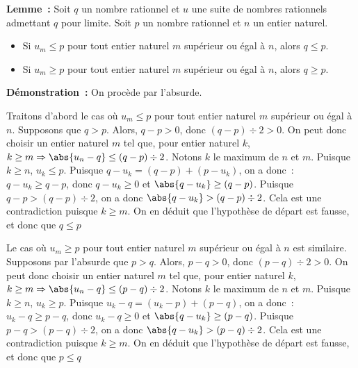 \medskip

\noindent\textbf{Lemme :} Soit $q$ un nombre rationnel et $u$ une suite de nombres rationnels admettant $q$ pour limite.
    Soit $p$ un nombre rationnel et $n$ un entier naturel.
    \begin{itemize}[nosep]
        \item Si $u_m \leq p$ pour tout entier naturel $m$ supérieur ou égal à $n$, alors $q \leq p$.
        \item Si $u_m \geq p$ pour tout entier naturel $m$ supérieur ou égal à $n$, alors $q \geq p$.
    \end{itemize}

\medskip

\noindent\textbf{Démonstration :} On procède par l'absurde.
    
    Traitons d'abord le cas où $u_m \leq p$ pour tout entier naturel $m$ supérieur ou égal à $n$.
    Supposons que $q > p$. 
    Alors, $q - p > 0$, donc $(q - p) \div 2 > 0$. 
    On peut donc choisir un entier naturel $m$ tel que, pour entier naturel $k$, $k \geq m \Rightarrow \abs{u_n - q} \leq (q - p) \div 2$.
    Notons $k$ le maximum de $n$ et $m$. 
    Puisque $k \geq n$, $u_k \leq p$. 
    Puisque $q - u_k = (q - p) + (p - u_k)$, on a donc : $q - u_k \geq q - p$, donc $q - u_k \geq 0$ et $\abs{q - u_k} \geq (q - p)$.
    Puisque $q - p > (q - p) \div 2$, on a donc $\abs{q - u_k} > (q - p) \div 2$.
    Cela est une contradiction puisque $k \geq m$.
    On en déduit que l'hypothèse de départ est fausse, et donc que $q \leq p$

    Le cas où $u_m \geq p$ pour tout entier naturel $m$ supérieur ou égal à $n$ est similaire. 
    Supposons par l'absurde que $p > q$. 
    Alors, $p - q > 0$, donc $(p - q) \div 2 > 0$. 
    On peut donc choisir un entier naturel $m$ tel que, pour entier naturel $k$, $k \geq m \Rightarrow \abs{u_n - q} \leq (p - q) \div 2$.
    Notons $k$ le maximum de $n$ et $m$. 
    Puisque $k \geq n$, $u_k \geq p$. 
    Puisque $u_k - q = (u_k - p) + (p - q)$, on a donc : $u_k - q \geq p - q$, donc $u_k - q \geq 0$ et $\abs{q - u_k} \geq (p - q)$.
    Puisque $p - q > (p - q) \div 2$, on a donc $\abs{q - u_k} > (p - q) \div 2$.
    Cela est une contradiction puisque $k \geq m$.
    On en déduit que l'hypothèse de départ est fausse, et donc que $p \leq q$

    \done

\medskip

